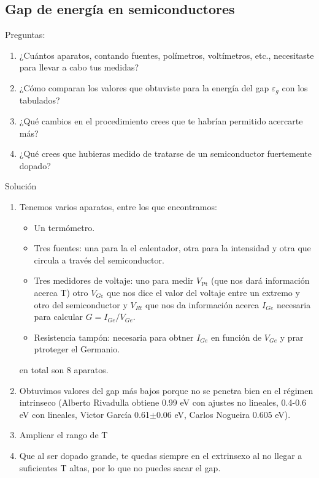 \begin{Enunciado}
	\subsection*{Gap de energía en semiconductores}
	Preguntas: 
	\begin{enumerate}[label=\alph*)]
		\item ¿Cuántos aparatos, contando fuentes, polímetros, voltímetros, etc., necesitaste para llevar a cabo tus medidas?
		\item ¿Cómo comparan los valores que obtuviste para la energía del gap \( \varepsilon_g \) con los tabulados?
		\item ¿Qué cambios en el procedimiento crees que te habrían permitido acercarte más?
		\item ¿Qué crees que hubieras medido de tratarse de un semiconductor fuertemente dopado?
	\end{enumerate}

\end{Enunciado}

Solución
\begin{enumerate}[label=\alph*)]
	\item Tenemos varios aparatos, entre los que encontramos:
	\begin{itemize}
		\item Un termómetro.
		\item Tres fuentes: una para la el calentador, otra para la intensidad y otra que circula a través del semiconductor. 
		\item Tres medidores de voltaje: uno para medir $V_{\text{Pt}}$ (que nos dará información acerca T) otro $V_{Ge}$ que nos dice el valor del voltaje entre un extremo y otro del semiconductor y $V_{Rt}$ que nos da información acerca $I_{Ge}$ necesaria para calcular $G=I_{Ge}/V_{Ge}$. 
		\item Resistencia tampón: necesaria para obtner $I_{Ge}$ en función de $V_{Ge}$ y prar ptroteger el Germanio. 
	\end{itemize}
	en total son 8 aparatos.
	\item Obtuvimos valores del gap más bajos porque no se penetra bien en el régimen intrinseco (Alberto Rivadulla obtiene 0.99 eV con ajustes no lineales, 0.4-0.6 eV con lineales, Victor García 0.61$\pm$0.06 eV, Carlos Nogueira 0.605 eV). 
	\item Amplicar el rango de T
	\item Que al ser dopado grande, te quedas siempre en el extrinsexo al no llegar a suficientes T altas, por lo que no puedes sacar el gap.
\end{enumerate}